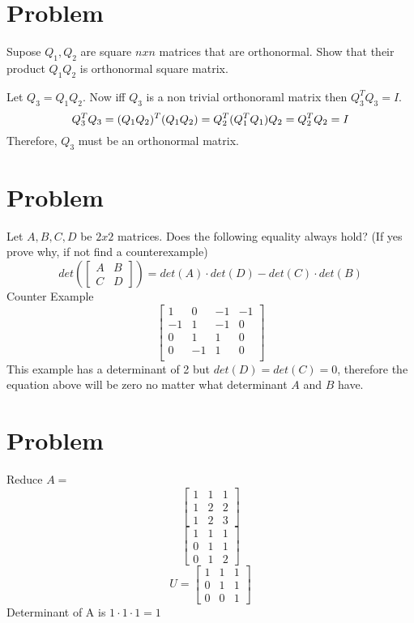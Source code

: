 \documentclass{article}
\begin{document}
\section{Problem}
Supose $Q_{1}, Q_{2}$ are square $n x n$ matrices that are orthonormal. Show that their product $Q_{1}Q_{2}$ is orthonormal square matrix.

Let $Q_{3} = Q_{1}Q_{2}$. Now iff $Q_{3}$ is a non trivial orthonoraml matrix then $Q_{3}^{T}Q_{3} = I$.
\newline
\[
Q_{3}^{T}Q_{3} \\
= (Q_{1}Q_{2})^{T}(Q_{1}Q_{2}) \\
= Q_{2}^{T}(Q_{1}^{T}Q_{1})Q_{2} \\
= Q_{2}^{T}Q_{2} \\
= I
\]
Therefore, $Q_{3}$ must be an orthonormal matrix.

\section{Problem}
Let $A, B, C, D$ be $2 x 2$ matrices. Does the following equality always hold? (If yes prove why, if not find a counterexample)
\[
	det(\begin{bmatrix}A & B\\C & D\end{bmatrix}) = det(A) \cdot det(D) - det(C) \cdot det(B)
\]
Counter Example
\[
\begin{bmatrix}
1 & 0 & -1 & -1 \\
-1 & 1 & -1 & 0 \\
0 & 1 & 1 & 0 \\
0 & -1 & 1 & 0 \\
\end{bmatrix}
\]
This example has a determinant of 2 but $det(D) = det(C) = 0$, therefore the equation above will be zero no matter what determinant $A$ and $B$ have.


\section{Problem}
Reduce $A = $
\[
\begin{bmatrix}
1 & 1 & 1 \\
1 & 2 & 2 \\
1 & 2 & 3   
\end{bmatrix}
\]
\[
\begin{bmatrix}
1 & 1 & 1 \\
0 & 1 & 1 \\
0 & 1 & 2   
\end{bmatrix}
\]
\[
U
=
\begin{bmatrix}
1 & 1 & 1 \\
0 & 1 & 1 \\
0 & 0 & 1   
\end{bmatrix}
\]
Determinant of A is $1 \cdot 1 \cdot 1 = 1$
\end{document}
